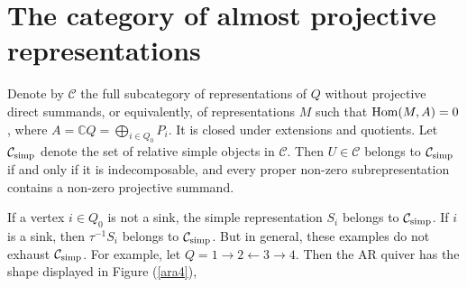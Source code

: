\documentclass{amsart}
\numberwithin{equation}{section}
\theoremstyle{remark}
\begin{document}
\section{The category of almost projective representations}\label{sec:category}


Denote by $\mathcal{C}$ the full subcategory of representations of $Q$ without projective direct summands, or equivalently, of representations $M$ such that ${\rm Hom}(M,A)=0$, where $A=\mathbb{C}Q=\bigoplus_{i\in Q_0}P_i$. It is closed under extensions and quotients. Let $\mathcal{C}_{\rm simp}$ denote the set of relative simple objects in $\mathcal{C}$. Then $U\in\mathcal{C}$ belongs to $\mathcal{C}_{\rm simp}$ if and only if it is indecomposable, and every proper non-zero subrepresentation contains a non-zero projective summand. 

If a vertex $i\in Q_0$ is not a sink, the simple representation $S_i$ belongs to $\mathcal{C}_{\rm simp}$. If $i$ is a sink, then $\tau^{-1}S_i$ belongs to $\mathcal{C}_{\rm simp}$. But in general, these examples do not exhaust $\mathcal{C}_{\rm simp}$. 
For example, let $Q=1\rightarrow 2\leftarrow 3\rightarrow 4$. Then the AR quiver has the shape displayed in Figure (\ref{ara4}), 
\end{document}
